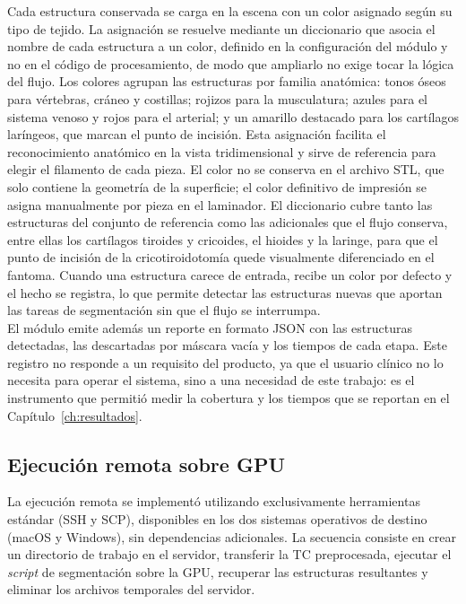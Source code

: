 Cada estructura conservada se carga en la escena con un color asignado según su tipo de tejido. La asignación se resuelve mediante un diccionario que asocia el nombre de cada estructura a un color, definido en la configuración del módulo y no en el código de procesamiento, de modo que ampliarlo no exige tocar la lógica del flujo. Los colores agrupan las estructuras por familia anatómica: tonos óseos para vértebras, cráneo y costillas; rojizos para la musculatura; azules para el sistema venoso y rojos para el arterial; y un amarillo destacado para los cartílagos laríngeos, que marcan el punto de incisión. Esta asignación facilita el reconocimiento anatómico en la vista tridimensional y sirve de referencia para elegir el filamento de cada pieza. El color no se conserva en el archivo STL, que solo contiene la geometría de la superficie; el color definitivo de impresión se asigna manualmente por pieza en el laminador. El diccionario cubre tanto las estructuras del conjunto de referencia como las adicionales que el flujo conserva, entre ellas los cartílagos tiroides y cricoides, el hioides y la laringe, para que el punto de incisión de la cricotiroidotomía quede visualmente diferenciado en el fantoma. Cuando una estructura carece de entrada, recibe un color por defecto y el hecho se registra, lo que permite detectar las estructuras nuevas que aportan las tareas de segmentación sin que el flujo se interrumpa.\\

El módulo emite además un reporte en formato JSON con las estructuras detectadas, las descartadas por máscara vacía y los tiempos de cada etapa. Este registro no responde a un requisito del producto, ya que el usuario clínico no lo necesita para operar el sistema, sino a una necesidad de este trabajo: es el instrumento que permitió medir la cobertura y los tiempos que se reportan en el Capítulo~\ref{ch:resultados}.\\

\subsection{Ejecución remota sobre GPU}

La ejecución remota se implementó utilizando exclusivamente herramientas estándar (SSH y SCP), disponibles en los dos sistemas operativos de destino (macOS y Windows), sin dependencias adicionales. La secuencia consiste en crear un directorio de trabajo en el servidor, transferir la TC preprocesada, ejecutar el \textit{script} de segmentación sobre la GPU, recuperar las estructuras resultantes y eliminar los archivos temporales del servidor.\\

